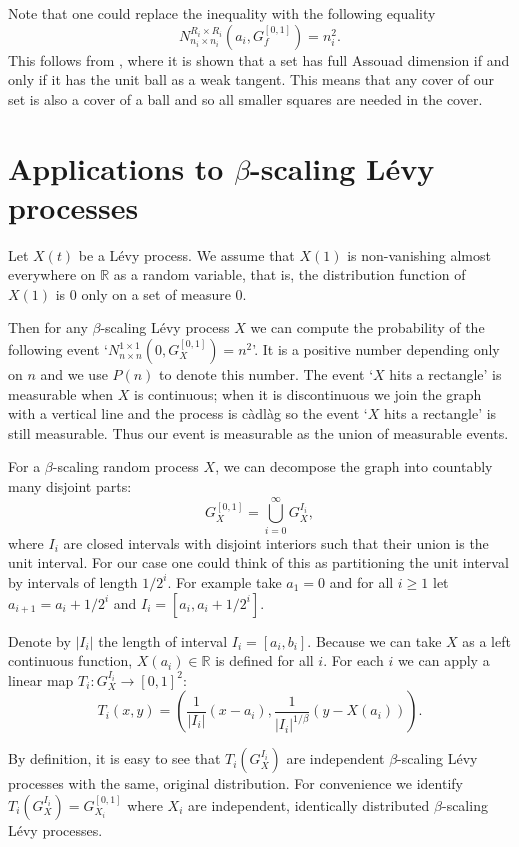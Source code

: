 \begin{rem}
	Note that one could replace the inequality with the following equality
	\[
	N_{n_i\times n_i}^{R_i \times R_i }(a_i,G_f^{[0,1]})= n_i^2.
	\]
	This follows from \cite[Theorem 2.4]{FY}, where it is shown that a set has full Assouad dimension if and only if it has the unit ball as a weak tangent. This means that any cover of our set is also a cover of a ball and so all smaller squares are needed in the cover.
\end{rem}

\section{Applications to  $\beta$-scaling L\'evy processes}\label{LP}

Let $X(t)$ be a L\'evy process. We assume that $X(1)$ is non-vanishing almost everywhere on $\mathbb{R}$ as a random variable, that is, the distribution function of $X(1)$ is 0 only on a set of measure 0. 

Then for any $\beta$-scaling L\'evy process $X$ we can compute the probability of the following event `$N_{n\times n}^{1 \times 1 }(0,G_X^{[0,1]})=n^2$'. It is a positive number depending only on $n$ and we use $P(n)$ to denote this number. The event `$X$ hits a rectangle' is measurable when $X$ is continuous; when it is discontinuous we join the graph with a vertical line and the process is c\`adl\`ag so the event `$X$ hits a rectangle' is still measurable. Thus our event is measurable as the union of measurable events.

For a $\beta$-scaling random process $X$, we can decompose the graph into countably many disjoint parts:
\[
G_X^{[0,1]}=\bigcup_{i=0}^\infty G_X^{I_i},
\]
where $I_i$ are closed intervals with disjoint interiors such that their union is the unit interval. For our case one could think of this as partitioning the unit interval by intervals of length $1/2^i$. For example take $a_1=0$ and for all $i\geq 1$ let $a_{i+1}=a_i+1/2^i$ and $I_i=[a_i,a_i+1/2^{i}].$

Denote by $|I_i|$ the length of interval $I_i=[a_i,b_i]$. Because we can take $X$ as a left continuous function, $X(a_i)\in\mathbb{R}$ is defined for all $i$. For each $i$ we can apply a linear map $T_i: G_X^{I_i} \rightarrow [0,1]^2$:
\[
T_i(x,y)=\left(\frac{1}{|I_i|}(x-a_i),\frac{1}{|I_i|^{1/\beta}}(y-X(a_i))\right).
\]

By definition, it is easy to see that $T_i(G_X^{I_i})$ are independent $\beta$-scaling L\'evy processes with the same, original distribution. For convenience we identify $T_i(G_X^{I_i})=G_{X_i}^{[0,1]}$ where $X_i$  are independent, identically distributed $\beta$-scaling L\'evy processes.

